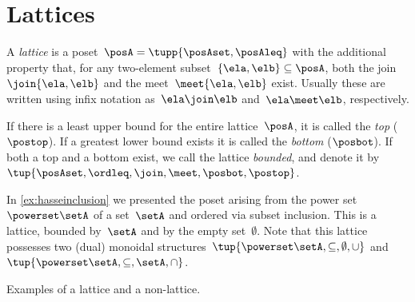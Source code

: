 

\section{Lattices}



\begin{definition}[Lattice]
    \label{def:lattice}
    A \emph{lattice} is a poset~$\posA=\tupp{\posAset,\posAleq}$ with the additional property that, for any two-element subset~$\{\ela, \elb \} \subseteq \posA$, both the join~$\join \{\ela, \elb \}$ and the meet~$\meet \{\ela, \elb \}$ exist.
    Usually these are written using infix notation as~$\ela \join \elb$ and~$\ela \meet \elb$, respectively.
\end{definition}


\begin{remark}
    \label{rem:bounded-lattices}
    \label{def:top}
    \label{def:bot}
    If there is a least upper bound for the entire lattice~$\posA$, it is called
    the \emph{top} ($\postop$).
If a greatest lower bound exists it is called the \emph{bottom} ($\posbot$).
    If both a top and a bottom exist, we call the lattice \emph{bounded}, and denote it by~$\tup{\posAset,\ordleq,\join,\meet,\posbot,\postop}$.
\end{remark}

\begin{example}
    In \cref{ex:hasseinclusion} we presented the poset arising from the power set~$\powerset \setA$ of a set~$\setA$ and ordered via subset inclusion.
    This is a lattice, bounded by~$\setA$ and by the empty set~$\emptyset$.
    Note that this lattice possesses two (dual) monoidal structures~$\tup{\powerset \setA,\subseteq,\emptyset,\cup}$ and~$\tup{\powerset \setA,\subseteq,\setA,\cap}$.
\end{example}
\begin{marginfigure}
    
    
    \caption{Examples of a lattice and a non-lattice. }
    \label{fig:exlattice}
\end{marginfigure}

